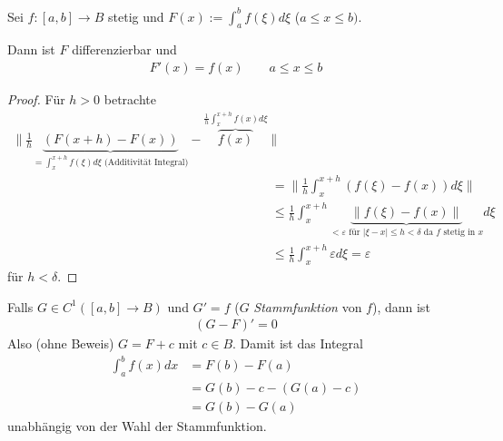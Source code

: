 \begin{theorem} \label{3.5}
	Sei $f: [a,b] \to B$ stetig und $F(x) := \int_a^b f(\xi) d\xi$ ($a \le x \le b)$.

	Dann ist $F$ differenzierbar und 
	\begin{align*}
		F'(x) = f(x) 
		\qquad a \le x \le b
	\end{align*}
	\begin{proof}
		Für $h > 0$ betrachte
		\begin{align*}
			\Big\| \tfrac 1h \underbrace{(F(x+h) - F(x))}_{= \int_x^{x+h}f(\xi) d\xi \text{ (Additivität Integral)}} - \overbrace{f(x)}^{\frac 1h \int_{x}^{x+h}f(x) d\xi} \Big\| \\
			&= \bigg\| \frac 1h \int_x^{x+h} (f(\xi) - f(x)) d\xi \bigg\|  \\
			&\le \frac 1h \int_x^{x+h} \underbrace{\|f(\xi) - f(x)\|}_{< \varepsilon \text{ für } |\xi - x| \le h < \delta \text{ da $f$ stetig in $x$}} d\xi \\
			&\le \frac 1h \int_x^{x+h} \varepsilon d\xi = \varepsilon
		\end{align*}
		für $h < \delta$.
	\end{proof}
\end{theorem}

\begin{theorem} \label{3.6}
	Falls $G \in C^1([a,b] \to B)$ und $G' = f$ ($G$ \emph{Stammfunktion} von $f$), dann ist
	\begin{align*}
		(G - F)' = 0
	\end{align*}
	Also (ohne Beweis) $G = F + c$ mit $c \in B$.
	Damit ist das Integral
	\begin{align*}
		\int_a^b f(x) dx 
		&= F(b) - F(a) \\
		&= G(b) - c - (G(a) - c) \\
		&= G(b) - G(a)
	\end{align*}
	unabhängig von der Wahl der Stammfunktion.
\end{theorem}

